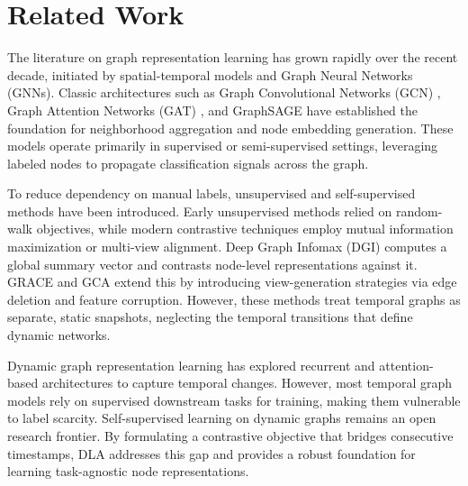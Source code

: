 \section{Related Work}
The literature on graph representation learning has grown rapidly over the recent decade, initiated by spatial-temporal models and Graph Neural Networks (GNNs). Classic architectures such as Graph Convolutional Networks (GCN) \cite{kipf2016semi}, Graph Attention Networks (GAT) \cite{velickovic2018graph}, and GraphSAGE \cite{hamilton2017inductive} have established the foundation for neighborhood aggregation and node embedding generation. These models operate primarily in supervised or semi-supervised settings, leveraging labeled nodes to propagate classification signals across the graph.

To reduce dependency on manual labels, unsupervised and self-supervised methods have been introduced. Early unsupervised methods relied on random-walk objectives, while modern contrastive techniques employ mutual information maximization or multi-view alignment. Deep Graph Infomax (DGI) \cite{velickovic2019deep} computes a global summary vector and contrasts node-level representations against it. GRACE \cite{zhu2020deep} and GCA \cite{you2020graph} extend this by introducing view-generation strategies via edge deletion and feature corruption. However, these methods treat temporal graphs as separate, static snapshots, neglecting the temporal transitions that define dynamic networks.

Dynamic graph representation learning has explored recurrent and attention-based architectures to capture temporal changes. However, most temporal graph models rely on supervised downstream tasks for training, making them vulnerable to label scarcity. Self-supervised learning on dynamic graphs remains an open research frontier. By formulating a contrastive objective that bridges consecutive timestamps, DLA addresses this gap and provides a robust foundation for learning task-agnostic node representations.
